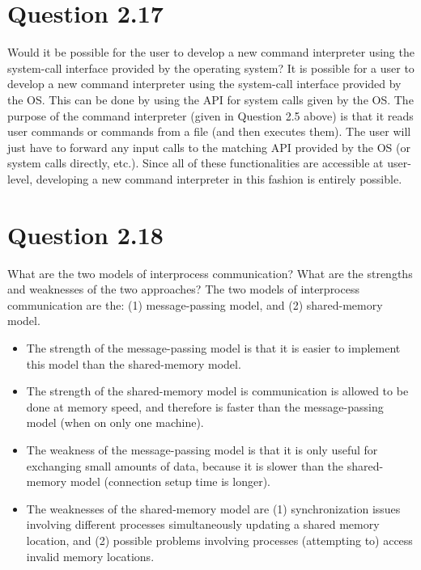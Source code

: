 \documentclass[12pt]{article}
\begin{document}
\section*{Question 2.17} {\color{blue}Would it be possible for the user to develop a new command interpreter using the system-call interface provided by the operating system?} It is possible for a user to develop a new command interpreter using the system-call interface provided by the OS. This can be done by using the API for system calls given by the OS. The purpose of the command interpreter (given in Question 2.5 above) is that it reads user commands or commands from a file (and then executes them). The user will just have to forward any input calls to the matching API provided by the OS (or system calls directly, etc.). Since all of these functionalities are accessible at user-level, developing a new command interpreter in this fashion is entirely possible.

\section*{Question 2.18} {\color{blue}What are the two models of interprocess communication? What are the strengths and weaknesses of the two approaches?} The two models of interprocess communication are the: (1) message-passing model, and (2) shared-memory model. 
\begin{itemize}
\item The strength of the message-passing model is that it is easier to implement this model than the shared-memory model. 
\item The strength of the shared-memory model is communication is allowed to be done at memory speed, and therefore  is faster than the message-passing model (when on only one machine).
\item The weakness of the message-passing model is that it is only useful for exchanging small amounts of data, because it is slower than the shared-memory model (connection setup time is longer).
\item The weaknesses of the shared-memory model are (1) synchronization issues involving different processes simultaneously updating a shared memory location, and (2) possible problems involving processes (attempting to) access invalid memory locations.
\end{itemize}
\end{document}

